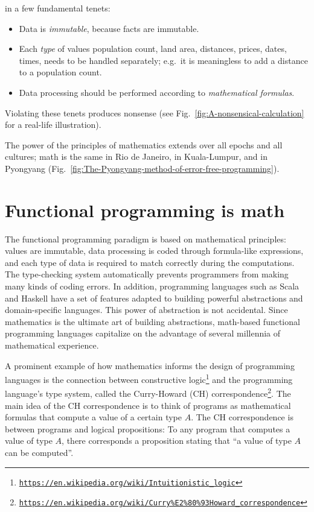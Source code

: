  in a few fundamental tenets:
\begin{itemize}
\item Data is \emph{immutable}, because facts are immutable. 
\item Each \emph{type} of values \textendash{} population count, land area,
distances, prices, dates, times, \textendash{} needs to be handled
separately; e.g.\ it is meaningless to add a distance to a population
count.
\item Data processing should be performed according to \emph{mathematical
formulas}. 
\end{itemize}
Violating these tenets produces nonsense (see Fig.\ \ref{fig:A-nonsensical-calculation}
for a real-life illustration).

The power of the principles of mathematics extends over all epochs
and all cultures; math is the same in Rio de Janeiro, in Kuala-Lumpur,
and in Pyongyang (Fig.\ \ref{fig:The-Pyongyang-method-of-error-free-programming}).

\section{Functional programming is math}

The functional programming paradigm is based on mathematical principles:
values are immutable, data processing is coded through formula-like
expressions, and each type of data is required to match correctly
during the computations. The type-checking system automatically prevents
programmers from making many kinds of coding errors. In addition,
programming languages such as Scala and Haskell have a set of features
adapted to building powerful abstractions and domain-specific languages.
This power of abstraction is not accidental. Since mathematics is
the ultimate art of building abstractions, math-based functional programming
languages capitalize on the advantage of several millennia of mathematical
experience.

A prominent example of how mathematics informs the design of programming
languages is the connection between constructive logic\footnote{\texttt{\href{https://en.wikipedia.org/wiki/Intuitionistic_logic}{https://en.wikipedia.org/wiki/Intuitionistic\_logic}}}
and the programming language's type system, called the Curry-Howard
(CH) correspondence\footnote{\texttt{\href{https://en.wikipedia.org/wiki/Curry\%E2\%80\%93Howard_correspondence}{https://en.wikipedia.org/wiki/Curry\%E2\%80\%93Howard\_correspondence}}}.
The main idea of the CH correspondence
is to think of programs as mathematical formulas that compute a value
of a certain type $A$. The CH correspondence is between programs
and logical propositions: To any program that computes a value of
type $A$, there corresponds a proposition stating that ``a value
of type $A$ can be computed''.

